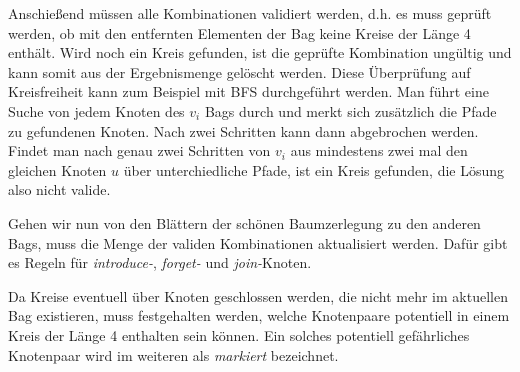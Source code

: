 Anschießend müssen alle Kombinationen validiert werden, d.h. es muss geprüft werden, ob mit den entfernten Elementen der Bag keine Kreise der Länge 4 enthält. Wird noch ein Kreis gefunden, ist die geprüfte Kombination ungültig und kann somit aus der Ergebnismenge gelöscht werden. Diese Überprüfung auf Kreisfreiheit kann zum Beispiel mit BFS durchgeführt werden. Man führt eine Suche von jedem Knoten des $v_i$ Bags durch und merkt sich zusätzlich die Pfade zu gefundenen Knoten. Nach zwei Schritten kann dann abgebrochen werden. Findet man nach genau zwei Schritten von $v_i$ aus mindestens zwei mal den gleichen Knoten $u$ über unterchiedliche Pfade, ist ein Kreis gefunden, die Lösung also nicht valide.

Gehen wir nun von den Blättern der schönen Baumzerlegung zu den anderen Bags, muss die Menge der validen Kombinationen aktualisiert werden. Dafür gibt es Regeln für \textit{introduce-}, \textit{forget-} und \textit{join-}Knoten. 

Da Kreise eventuell über Knoten geschlossen werden, die nicht mehr im aktuellen Bag existieren, muss festgehalten werden, welche Knotenpaare potentiell in einem Kreis der Länge 4 enthalten sein können. Ein solches potentiell gefährliches Knotenpaar wird im weiteren als \textit{markiert} bezeichnet.

